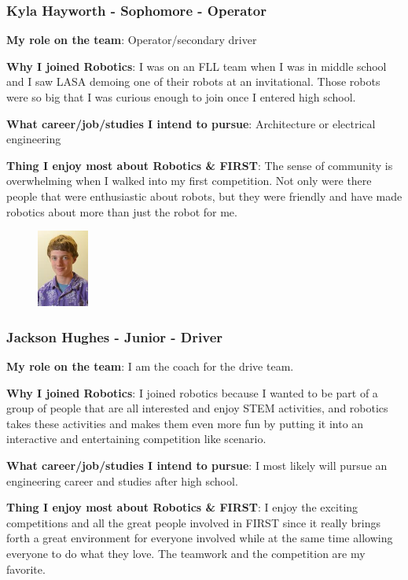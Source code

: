 \subsubsection{Kyla Hayworth - Sophomore - Operator} 
{\bf My role on the team}: Operator/secondary driver

{\bf Why I joined Robotics}: I was on an FLL team when I was in middle school and I saw LASA demoing one of their robots at an invitational. Those robots were so big that I was curious enough to join once I entered high school.

{\bf What career/job/studies I intend to pursue}: Architecture or electrical engineering

{\bf Thing I enjoy most about Robotics \& FIRST}: The sense of community is overwhelming when I walked into my first competition. Not only were there people that were enthusiastic about robots, but they were friendly and have made robotics about more than just the robot for me. 

\begin{figure}
	\centering
	\includegraphics[height=1in]{jackson}
\end{figure}
\subsubsection{Jackson Hughes - Junior - Driver} 
{\bf My role on the team}: I am the coach for the drive team.

{\bf Why I joined Robotics}: I joined robotics because I wanted to be part of a group of people that are all interested and enjoy STEM activities, and robotics takes these activities and makes them even more fun by putting it into an interactive and entertaining competition like scenario.

{\bf What career/job/studies I intend to pursue}: I most likely will pursue an engineering career and studies after high school. 

{\bf Thing I enjoy most about Robotics \& FIRST}: I enjoy the exciting competitions and all the great people involved in FIRST since it really brings forth a great environment for everyone involved while at the same time allowing everyone to do what they love.  The teamwork and the competition are my favorite.  

